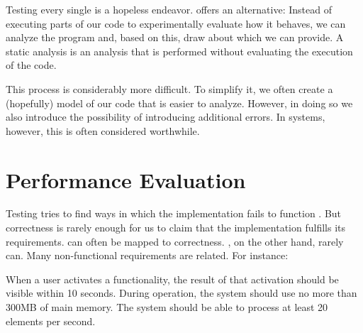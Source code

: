 Testing every single  is a hopeless endeavor.  offers an alternative: Instead of executing parts of our code to experimentally evaluate how it behaves, we can analyze the program  and, based on this, draw  about which  we can provide. A static analysis is an analysis that is performed without evaluating the execution of the code.

This process is considerably more difficult. To simplify it, we often create a (hopefully)  model of our code that is easier to analyze. However, in doing so we also introduce the possibility of introducing additional errors. In  systems, however, this  is often considered worthwhile.

\section{Performance Evaluation}

Testing tries to find ways in which the implementation fails to function . But correctness is rarely enough for us to claim that the implementation fulfills its requirements.  can often be mapped to correctness. , on the other hand, rarely can. Many non-functional requirements are  related. For instance:
\begin{itemize}
   When a user activates a functionality, the result of that activation should be visible within 10 seconds.
   During operation, the system should use no more than 300MB of main memory.
   The system should be able to process at least 20 elements per second.
\end{itemize}

